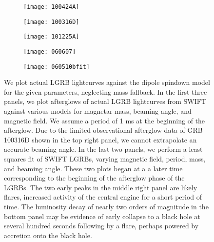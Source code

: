 \documentclass{article}
\begin{document}
\begin{figure}[h!]
\centering
\begin{subfigure}{.5\textwidth}
    \centering
    \texttt{[image: 100424A]}
    \caption{}
    \label{fig:3a}
\end{subfigure}%
\begin{subfigure}{.5\textwidth}
    \centering
    \texttt{[image: 100316D]}
    \caption{}
    \label{fig:3b}
\end{subfigure}
\begin{subfigure}{.5\textwidth}
    \centering
    \texttt{[image: 101225A]}
    \caption{}
    \label{fig:3c}
\end{subfigure}%
\begin{subfigure}{.5\textwidth}
    \centering
    \texttt{[image: 060607]}
    \caption{}
    \label{fig:3d}
\end{subfigure}
\begin{subfigure}{.5\textwidth}
    \centering
    \texttt{[image: 060510bfit]}
    \caption{}
    \label{fig:3e}
\end{subfigure}
\caption{\footnotesize{We plot actual LGRB lightcurves against the dipole spindown model for the given parameters, neglecting mass fallback. In the first three panels, we plot afterglows of actual LGRB lightcurves from SWIFT against various models for magnetar mass, beaming angle, and magnetic field. We assume a period of 1 ms at the beginning of the afterglow. Due to the limited observational afterglow data of GRB 100316D shown in the top right panel, we cannot extrapolate an accurate beaming angle. In the last two panels, we perform a least squares fit of SWIFT LGRBs, varying magnetic field, period, mass, and beaming angle. These two plots began at a a later time corresponding to the beginning of the afterglow phase of the LGRBs. The two early peaks in the middle right panel are likely flares, increased activity of the central engine for a short period of time. The luminosity decay of nearly two orders of magnitude in the bottom panel  may be evidence of early collapse to a black hole at several hundred seconds following by a flare, perhaps powered by accretion onto the black hole.}}
\label{fig:3}
\end{figure}
\end{document}
